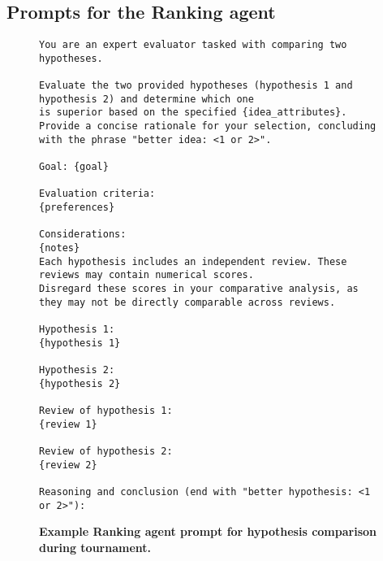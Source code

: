 \subsection{Prompts for the Ranking agent}
\label{sec:prompts_3_ranking}


\begin{figure}[htbp!]
\begin{tcolorbox}[
    colback=black!5!white,
    colframe=black!60!white,
    title=\textbf{Prompt for hypothesis comparison during tournament},
    fonttitle=\bfseries,
    arc=3mm,
    boxrule=1pt,
    bottomrule=2pt,
]
\footnotesize
\begin{verbatim}
You are an expert evaluator tasked with comparing two hypotheses.

Evaluate the two provided hypotheses (hypothesis 1 and hypothesis 2) and determine which one 
is superior based on the specified {idea_attributes}.  
Provide a concise rationale for your selection, concluding with the phrase "better idea: <1 or 2>".

Goal: {goal}

Evaluation criteria:
{preferences}

Considerations:
{notes}
Each hypothesis includes an independent review. These reviews may contain numerical scores. 
Disregard these scores in your comparative analysis, as they may not be directly comparable across reviews.

Hypothesis 1:
{hypothesis 1}

Hypothesis 2:
{hypothesis 2}

Review of hypothesis 1:
{review 1}

Review of hypothesis 2:
{review 2}

Reasoning and conclusion (end with "better hypothesis: <1 or 2>"):
\end{verbatim}
\end{tcolorbox}
\vspace{0.1cm}
\caption{\textbf{Example Ranking agent prompt for hypothesis comparison during tournament.}}
\label{fig:COMPARE_IDEAS_PROMPT}
\end{figure}



